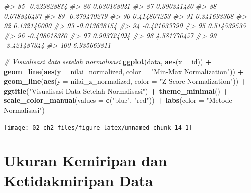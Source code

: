 \documentclass[
  oneside]{book}
\newenvironment{Shaded}{\begin{snugshade}}{\end{snugshade}}
\newcommand{\AttributeTok}[1]{\textcolor[rgb]{0.13,0.29,0.53}{#1}}
\newcommand{\CommentTok}[1]{\textcolor[rgb]{0.56,0.35,0.01}{\textit{#1}}}
\newcommand{\FunctionTok}[1]{\textcolor[rgb]{0.13,0.29,0.53}{\textbf{#1}}}
\newcommand{\NormalTok}[1]{#1}
\newcommand{\SpecialCharTok}[1]{\textcolor[rgb]{0.81,0.36,0.00}{\textbf{#1}}}
\newcommand{\StringTok}[1]{\textcolor[rgb]{0.31,0.60,0.02}{#1}}
\begin{document}
\begin{Shaded}
\begin{Highlighting}[]
\CommentTok{\#\textgreater{} 85        {-}0.229828884}
\CommentTok{\#\textgreater{} 86         0.030168021}
\CommentTok{\#\textgreater{} 87         0.390341480}
\CommentTok{\#\textgreater{} 88         0.078846437}
\CommentTok{\#\textgreater{} 89        {-}0.279470279}
\CommentTok{\#\textgreater{} 90         0.414807253}
\CommentTok{\#\textgreater{} 91         0.341693368}
\CommentTok{\#\textgreater{} 92         0.132146000}
\CommentTok{\#\textgreater{} 93        {-}0.013638154}
\CommentTok{\#\textgreater{} 94        {-}0.421633790}
\CommentTok{\#\textgreater{} 95         0.514539535}
\CommentTok{\#\textgreater{} 96        {-}0.408618380}
\CommentTok{\#\textgreater{} 97         0.903724094}
\CommentTok{\#\textgreater{} 98         4.581770457}
\CommentTok{\#\textgreater{} 99        {-}3.421487344}
\CommentTok{\#\textgreater{} 100        6.935669811}
\end{Highlighting}
\end{Shaded}

\begin{Shaded}
\begin{Highlighting}[]
\CommentTok{\# Visualisasi data setelah normalisasi}
\FunctionTok{ggplot}\NormalTok{(data, }\FunctionTok{aes}\NormalTok{(}\AttributeTok{x =}\NormalTok{ id)) }\SpecialCharTok{+}
  \FunctionTok{geom\_line}\NormalTok{(}\FunctionTok{aes}\NormalTok{(}\AttributeTok{y =}\NormalTok{ nilai\_normalized, }\AttributeTok{color =} \StringTok{"Min{-}Max Normalization"}\NormalTok{)) }\SpecialCharTok{+}
  \FunctionTok{geom\_line}\NormalTok{(}\FunctionTok{aes}\NormalTok{(}\AttributeTok{y =}\NormalTok{ nilai\_z\_normalized, }\AttributeTok{color =} \StringTok{"Z{-}Score Normalization"}\NormalTok{)) }\SpecialCharTok{+}
  \FunctionTok{ggtitle}\NormalTok{(}\StringTok{"Visualisasi Data Setelah Normalisasi"}\NormalTok{) }\SpecialCharTok{+}
  \FunctionTok{theme\_minimal}\NormalTok{() }\SpecialCharTok{+}
  \FunctionTok{scale\_color\_manual}\NormalTok{(}\AttributeTok{values =} \FunctionTok{c}\NormalTok{(}\StringTok{"blue"}\NormalTok{, }\StringTok{"red"}\NormalTok{)) }\SpecialCharTok{+}
  \FunctionTok{labs}\NormalTok{(}\AttributeTok{color =} \StringTok{"Metode Normalisasi"}\NormalTok{)}
\end{Highlighting}
\end{Shaded}

\begin{center}\texttt{[image: 02-ch2\_files/figure-latex/unnamed-chunk-14-1]} \end{center}

\chapter{Ukuran Kemiripan dan Ketidakmiripan Data}\label{simdis}
\end{document}
